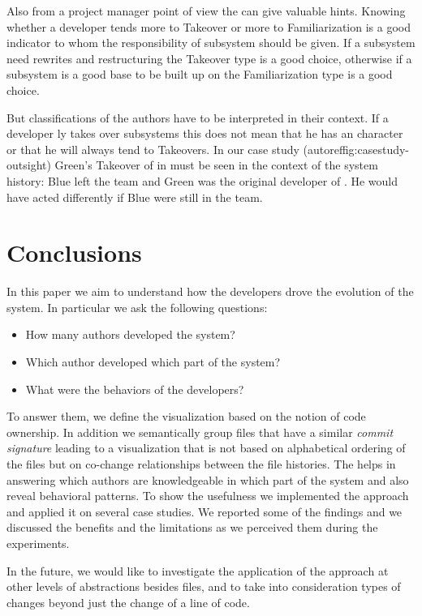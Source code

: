 \documentclass[10pt]{book}
\begin{document}
Also from a project manager point of view the \omap can give valuable hints. Knowing whether a developer tends more to  Takeover or more to Familiarization is a good indicator to whom the responsibility of subsystem should be given. If a subsystem need rewrites and restructuring the Takeover type is a good choice, otherwise if a subsystem is a good base to be built up on the Familiarization type is a good choice.

But classifications of the authors have to be interpreted in their context. If a developer ly takes over subsystems this does not mean that he has an  character or that he will always tend to Takeovers. In our case study (autoref{fig:casestudy-outsight}) Green's Takeover of  in  must be seen in the context of the system history: Blue left the team and Green was the original developer of . He would have acted differently if Blue were still in the team.

\section{Conclusions}\label{sec:conclusions}

In this paper we aim to understand how the developers drove the evolution of the system. In particular we ask the following questions:
\begin{itemize}
\item How many authors developed the system?
\item Which author developed which part of the system?
\item What were the behaviors of the developers?
\end{itemize}

To answer them, we define the \omap visualization based on the notion of code ownership. In addition we semantically group files that have a similar \emph{commit signature} leading to a visualization that is not  based on alphabetical ordering of the files but on co-change relationships between the file histories. The \omap helps in answering which authors are knowledgeable in which part of the system and also reveal behavioral patterns. To show the usefulness we implemented the approach and applied it on several case studies. We reported some of the findings and we discussed the benefits and the limitations as we perceived them during the experiments.

In the future, we would like to investigate the application of the approach at other levels of abstractions besides files, and to take into consideration types of changes beyond just the change of a line of code.
\end{document}
